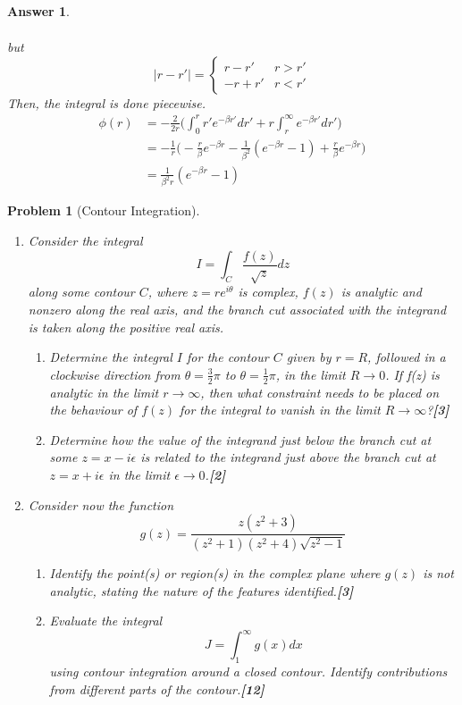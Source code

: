 \documentclass[a4paper]{article}
\newtheorem{ans}{Answer}[section]
\theoremstyle{new}
\newtheorem{qns}{Problem}[section]
\begin{document}
\begin{ans}
\begin{enumerate}[label=(\alph*)]
\begin{enumerate}[label=(\roman*)]
\begin{eqnarray}
\end{eqnarray}
but 
$$|r-r'|=
\left\{
        \begin{array}{ll}
      r-r' & r>r' \\
      -r+r' & r<r'
        \end{array}
    \right.$$
Then, the integral is done piecewise.
\begin{align}
\phi(r)&=-\frac{2}{2r}\bigg(\int_0^rr'e^{-\beta r'}dr'+r\int_r^\infty e^{-\beta r'}dr'\bigg)\nonumber\\&=-\frac{1}{r}\bigg(-\frac{r}{\beta}e^{-\beta r}-\frac{1}{\beta^2}(e^{-\beta r}-1)+\frac{r}{\beta}e^{-\beta r}\bigg)\nonumber\\&=\frac{1}{\beta^2r}(e^{-\beta r}-1)\nonumber
\end{align}
\end{enumerate}
\end{enumerate}
\end{ans}
\begin{qns}[Contour Integration]\leavevmode
\begin{enumerate}[label=(\alph*)]
\item Consider the integral
$$I=\int_C\frac{f(z)}{\sqrt{z}}dz$$
along some contour $C$, where $z=re^{i\theta}$ is complex, $f(z)$ is analytic and nonzero along the real axis, and the branch cut associated with the integrand is taken along the positive real axis.
\begin{enumerate}[label=(\roman*)]
\item Determine the integral $I$ for the contour $C$ given by $r = R$, followed in a clockwise direction from $\theta=\frac{3}{2}\pi$ to $\theta=\frac{1}{2}\pi$, in the limit $R\rightarrow 0$. If f(z) is analytic in the limit $r\rightarrow\infty$, then what constraint needs to be placed on the behaviour of $f(z)$ for the integral to vanish in the limit $R\rightarrow\infty$?\hfill\textbf{[3]}
\item Determine how the value of the integrand just below the branch cut at some $z=x-i\epsilon$ is related to the integrand just above the branch cut at $z = x + i\epsilon$ in the limit $\epsilon\rightarrow0$.\hfill\textbf{[2]}
\end{enumerate}
\item Consider now the function
$$g(z)=\frac{z(z^2+3)}{(z^2+1)(z^2+4)\sqrt{z^2-1}}$$
\begin{enumerate}[label=(\roman*)]
\item Identify the point(s) or region(s) in the complex plane where $g(z)$ is not analytic, stating the nature of the features identified.\hfill\textbf{[3]}
\item Evaluate the integral
$$J=\int_1^\infty g(x)dx$$
using contour integration around a closed contour. Identify contributions from different parts of the contour.\hfill\textbf{[12]}
\end{enumerate}
\end{enumerate}
\end{qns}
\end{document}
